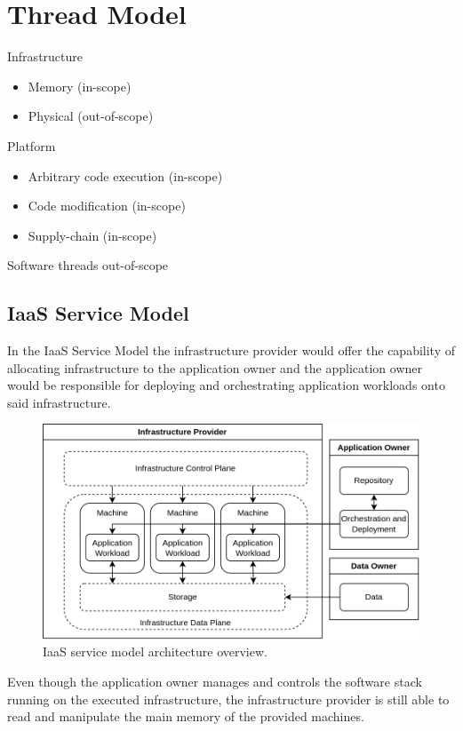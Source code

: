 \section{Thread Model}



Infrastructure
\begin{itemize}
  \item Memory (in-scope)
  \item Physical (out-of-scope)
\end{itemize}

Platform
\begin{itemize}
  \item Arbitrary code execution (in-scope)
  \item Code modification (in-scope)
  \item Supply-chain (in-scope)
\end{itemize}

Software threads out-of-scope

\subsection{IaaS Service Model}

In the IaaS Service Model the infrastructure provider would offer the capability
of allocating infrastructure to the application owner and the application owner
would be responsible for deploying and orchestrating application workloads onto
said infrastructure.

\begin{figure}[ht]
  \centering
  \includegraphics[width=0.8\linewidth]{resources/distributed-computing-infrastructure-architecture.png}
  \caption{IaaS service model architecture overview.}
  \label{fig:iaas-model-architecture}
\end{figure}

Even though the application owner manages and controls the software stack
running on the executed infrastructure, the infrastructure provider is still
able to read and manipulate the main memory of the provided machines.

